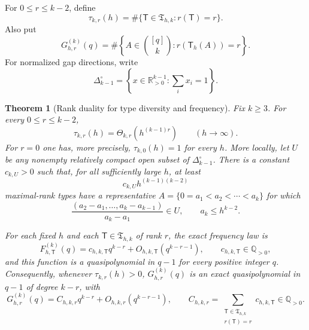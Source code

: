 \documentclass[11pt,reqno]{amsart}
\newtheorem{theorem}{Theorem}[section]
\theoremstyle{definition}
\theoremstyle{remark}
\begin{document}
For $0\leq r\leq k-2$, define
\[
 \tau_{k,r}(h)
 =\#\{\mathsf T\in\mathfrak T_{h,k}:r(\mathsf T)=r\}.
\]
Also put
\[
 G^{(k)}_{h,r}(q)
 =\#\left\{A\in\binom{[q]}k:r(\mathsf T_h(A))=r\right\}.
\]
For normalized gap directions, write
\[
 \Delta_{k-1}^{\circ}
 =\left\{x\in\mathbb R_{>0}^{k-1}:\sum_i x_i=1\right\}.
\]

\begin{theorem}[Rank duality for type diversity and frequency]
\label{thm:rank-diversity-frequency}
Fix $k\geq3$. For every $0\leq r\leq k-2$,
\begin{equation}\label{eq:rank-diversity}
 \tau_{k,r}(h)
 =\Theta_{k,r}\!\left(h^{(k-1)r}\right)
 \qquad(h\to\infty).
\end{equation}
For $r=0$ one has, more precisely, $\tau_{k,0}(h)=1$ for every $h$.
More locally, let $U$ be any nonempty relatively compact open subset of
$\Delta_{k-1}^{\circ}$. There is a constant $c_{k,U}>0$ such that, for all
sufficiently large $h$, at least
\[
 c_{k,U} h^{(k-1)(k-2)}
\]
maximal-rank types have a representative
$A=\{0=a_1<a_2<\cdots<a_k\}$ for which
\[
 \frac{(a_2-a_1,\ldots,a_k-a_{k-1})}{a_k-a_1}\in U,
 \qquad a_k\leq h^{k-2}.
\]

For each fixed $h$ and each $\mathsf T\in\mathfrak T_{h,k}$ of rank $r$,
the exact frequency law is
\begin{equation}\label{eq:master-type-frequency}
 F^{(k)}_{h,\mathsf T}(q)
 =c_{h,k,\mathsf T}q^{k-r}
  +O_{h,k,\mathsf T}(q^{k-r-1}),
 \qquad c_{h,k,\mathsf T}\in\mathbb Q_{>0},
\end{equation}
and this function is a quasipolynomial in $q-1$ for every positive integer
$q$. Consequently, whenever $\tau_{k,r}(h)>0$,
$G^{(k)}_{h,r}(q)$ is an exact quasipolynomial in $q-1$ of degree $k-r$,
with
\begin{equation}\label{eq:rank-aggregate-frequency}
 G^{(k)}_{h,r}(q)
 =C_{h,k,r}q^{k-r}+O_{h,k,r}(q^{k-r-1}),\qquad
 C_{h,k,r}=\sum_{\substack{\mathsf T\in\mathfrak T_{h,k}\\
                            r(\mathsf T)=r}}
                    c_{h,k,\mathsf T}\in\mathbb Q_{>0}.
\end{equation}
\end{theorem}
\end{document}
